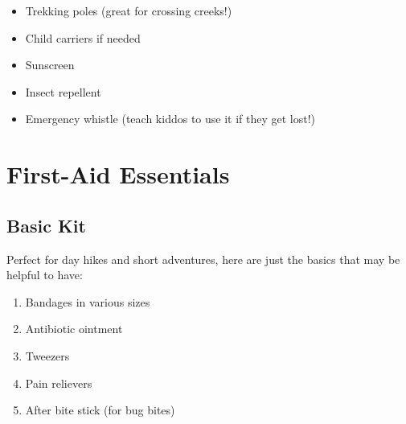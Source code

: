 \documentclass[
  letterpaper,
  DIV=11,
  numbers=noendperiod]{scrreprt}
\providecommand{\tightlist}{%
  \setlength{\itemsep}{0pt}\setlength{\parskip}{0pt}}\usepackage{longtable,booktabs,array}
\begin{document}
\begin{itemize}
\tightlist
\item
  Trekking poles (great for crossing creeks!)
\item
  Child carriers if needed
\item
  Sunscreen
\item
  Insect repellent
\item
  Emergency whistle (teach kiddos to use it if they get lost!)
\end{itemize}

\section{First-Aid Essentials}\label{first-aid-essentials}

\subsection{Basic Kit}\label{basic-kit}

Perfect for day hikes and short adventures, here are just the basics
that may be helpful to have:

\begin{enumerate}
\def\labelenumi{\arabic{enumi}.}
\tightlist
\item
  Bandages in various sizes
\item
  Antibiotic ointment
\item
  Tweezers
\item
  Pain relievers
\item
  After bite stick (for bug bites)
\end{enumerate}
\end{document}
